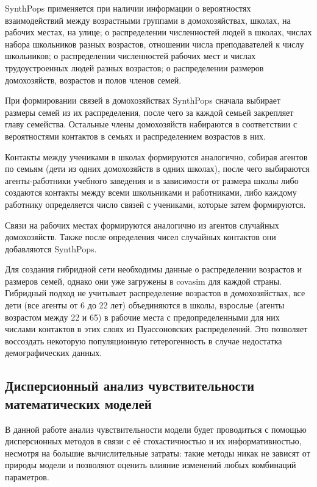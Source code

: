 \documentclass[a4paper,12pt]{article} %
\begin{document}
SynthPops применяется при наличии информации о вероятностях взаимодействий между возрастными группами в домохозяйствах, школах, на рабочих местах, на улице; о распределении численностей людей в школах, числах набора школьников разных возрастов, отношении числа преподавателей к числу школьников; о распределении численностей рабочих мест и числах трудоустроенных людей разных возрастов; о распределении размеров домохозяйств, возрастов и полов членов семей. 

При формировании связей в домохозяйствах SynthPops сначала выбирает размеры семей из их распределения, после чего за каждой семьей закрепляет главу семейства. Остальные члены домохозяйств набираются в соответствии с вероятностями контактов в семьях и распределением возрастов в них.

Контакты между учениками в школах формируются аналогично, собирая агентов по семьям (дети из одних домохозяйств в одних школах), после чего выбираются агенты-работники учебного заведения и в зависимости от размера школы либо создаются контакты между всеми школьниками и работниками, либо каждому работнику определяется число связей с учениками, которые затем формируются.

Связи на рабочих местах формируются аналогично из агентов случайных домохозяйств. Также после определения чисел случайных контактов они добавляются SynthPops.

Для создания гибридной сети необходимы данные о распределении возрастов и размеров семей, однако они уже загружены в \gls{covasim} для каждой страны. Гибридный подход не учитывает распределение возрастов в домохозяйствах, все дети (все агенты от 6 до 22 лет) объединяются в школы, взрослые (агенты возрастом между 22 и 65) в рабочие места с предопределенными для них числами контактов в этих слоях из Пуассоновских распределений. Это позволяет воссоздать некоторую популяционную гетерогенность в случае недостатка демографических данных.



\subsection{Дисперсионный анализ чувствительности математических моделей}

В данной работе анализ чувствительности модели будет проводиться с помощью дисперсионных методов в связи с её стохастичностью и их информативностью, несмотря на большие вычислительные затраты: такие методы никак не зависят от природы модели и позволяют оценить влияние изменений любых комбинаций параметров.
\end{document}
